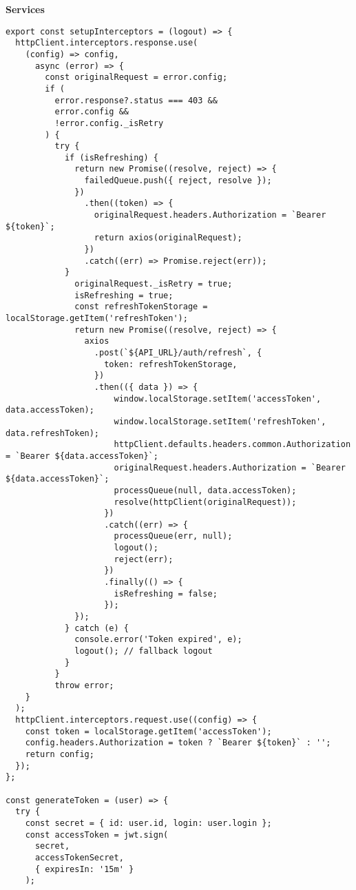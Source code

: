 \textbf{Services}
\begin{lstlisting}[style=CodeListing]
export const setupInterceptors = (logout) => {
  httpClient.interceptors.response.use(
    (config) => config,
      async (error) => {
        const originalRequest = error.config;
        if (
          error.response?.status === 403 &&
          error.config &&
          !error.config._isRetry
        ) {
          try {
            if (isRefreshing) {
              return new Promise((resolve, reject) => {
                failedQueue.push({ reject, resolve });
              })
                .then((token) => {
                  originalRequest.headers.Authorization = `Bearer ${token}`;
                  return axios(originalRequest);
                })
                .catch((err) => Promise.reject(err));
            }
              originalRequest._isRetry = true;
              isRefreshing = true;
              const refreshTokenStorage = localStorage.getItem('refreshToken');
              return new Promise((resolve, reject) => {
                axios
                  .post(`${API_URL}/auth/refresh`, {
                    token: refreshTokenStorage,
                  })
                  .then(({ data }) => {
                      window.localStorage.setItem('accessToken', data.accessToken);
                      window.localStorage.setItem('refreshToken', data.refreshToken);
                      httpClient.defaults.headers.common.Authorization = `Bearer ${data.accessToken}`;
                      originalRequest.headers.Authorization = `Bearer ${data.accessToken}`;
                      processQueue(null, data.accessToken);
                      resolve(httpClient(originalRequest));
                    })
                    .catch((err) => {
                      processQueue(err, null);
                      logout();
                      reject(err);
                    })
                    .finally(() => {
                      isRefreshing = false;
                    });
              });
            } catch (e) {
              console.error('Token expired', e);
              logout(); // fallback logout
            }
          }
          throw error;
    }
  );
  httpClient.interceptors.request.use((config) => {
    const token = localStorage.getItem('accessToken');
    config.headers.Authorization = token ? `Bearer ${token}` : '';
    return config;
  });
};

const generateToken = (user) => {
  try {
    const secret = { id: user.id, login: user.login };
    const accessToken = jwt.sign(
      secret,
      accessTokenSecret,
      { expiresIn: '15m' }
    );


\end{lstlisting}

